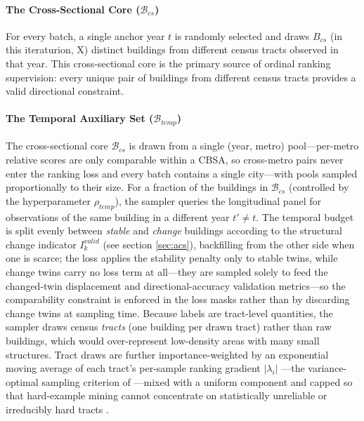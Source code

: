 \documentclass[conference]{IEEEtran}
\begin{document}
\paragraph{The Cross-Sectional Core ($\mathcal{B}_{cs}$)}
For every batch, a single anchor year $t$ is randomly selected and draws $B_{cs}$ (in this iteraturion, X) distinct buildings from different census tracts observed in that year. This cross-sectional core is the primary source of ordinal ranking supervision: every unique pair of buildings from different census tracts provides a valid directional constraint.

\paragraph{The Temporal Auxiliary Set ($\mathcal{B}_{temp}$)}
The cross-sectional core $\mathcal{B}_{cs}$ is drawn from a single (year, metro) pool—per-metro relative scores are only comparable within a CBSA, so cross-metro pairs never enter the ranking loss and every batch contains a single city—with pools sampled proportionally to their size. For a fraction of the buildings in $\mathcal{B}_{cs}$ (controlled by the hyperparameter $\rho_{temp}$), the sampler queries the longitudinal panel for observations of the same building in a different year $t' \neq t$. The temporal budget is split evenly between \emph{stable} and \emph{change} buildings according to the structural change indicator $I_{k}^{valid}$ (see section \ref{sec:acs}), backfilling from the other side when one is scarce; the loss applies the stability penalty only to stable twins, while change twins carry no loss term at all—they are sampled solely to feed the changed-twin displacement and directional-accuracy validation metrics—so the comparability constraint is enforced in the loss masks rather than by discarding change twins at sampling time. Because labels are tract-level quantities, the sampler draws census \emph{tracts} (one building per drawn tract) rather than raw buildings, which would over-represent low-density areas with many small structures. Tract draws are further importance-weighted by an exponential moving average of each tract's per-sample ranking gradient $|\lambda_i|$ \citep{burges2010ranknet}---the variance-optimal sampling criterion of \citet{katharopoulos2018notall}---mixed with a uniform component and capped so that hard-example mining \citep{shrivastava2016training} cannot concentrate on statistically unreliable or irreducibly hard tracts \citep{mindermann2022prioritized}.
\end{document}
